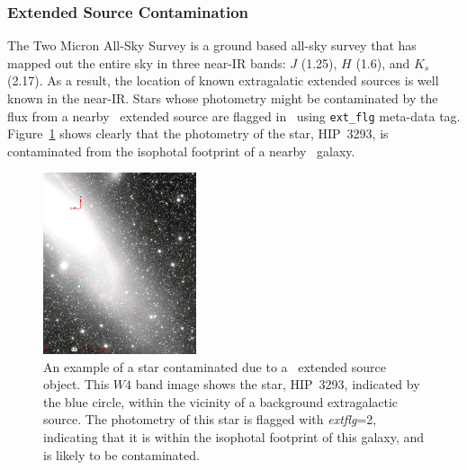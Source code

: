         \subsubsection{Extended Source Contamination}
    
    The Two Micron All-Sky Survey \citep[\mass\ ;][]{Skrutskie2006} is a ground based all-sky survey that has mapped out the entire sky in three near-IR bands: $J$ (1.25\micron), $H$ (1.6\micron), and $K_s$ (2.17\micron). As a result, the location of known extragalatic extended sources is well known in the near-IR. Stars whose photometry might be contaminated by the flux from a nearby \mass\ extended source are flagged in \WS\ using \verb|ext_flg| meta-data tag. Figure~\ref{fig:extflg_contamination} shows clearly that the photometry of the star, HIP~3293, is contaminated from the isophotal footprint of a nearby \mass\ galaxy. 
            
        \begin{figure}[!h]
        \centering
        \includegraphics[width=0.4\textwidth]{Ch2/extflg_2_HIP3293}
        \caption[Contamination From \mass\ Extended Source.]{An example of a star contaminated due to a \mass\ extended source object. This $W4$ band image shows the star, HIP~3293, indicated by the blue circle, within the vicinity of a background extragalactic source. The photometry of this star is flagged with \textit{extflg}=2, indicating that it is within the isophotal footprint of this galaxy, and is likely to be contaminated.}
        \label{fig:extflg_contamination}
        \end{figure}
        
    
        
